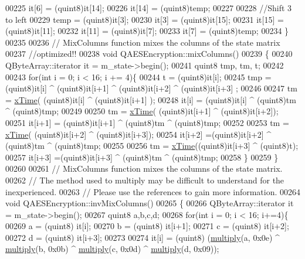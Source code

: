 \begin{DoxyCode}
00225     it[6]  = (quint8)it[14];
00226     it[14] = (quint8)temp;
00227 
00228     \textcolor{comment}{//Shift 3 to left}
00229     temp   = (quint8)it[3];
00230     it[3]  = (quint8)it[15];
00231     it[15] = (quint8)it[11];
00232     it[11] = (quint8)it[7];
00233     it[7]  = (quint8)temp;
00234 \}
00235 
00236 \textcolor{comment}{// MixColumns function mixes the columns of the state matrix}
00237 \textcolor{comment}{//optimized!!}
00238 \textcolor{keywordtype}{void} QAESEncryption::mixColumns()
00239 \{
00240   QByteArray::iterator it = m\_state->begin();
00241   quint8 tmp, tm, t;
00242 
00243   \textcolor{keywordflow}{for}(\textcolor{keywordtype}{int} i = 0; i < 16; i += 4)\{
00244     t       = (quint8)it[i];
00245     tmp     =  (quint8)it[i] ^ (quint8)it[i+1] ^ (quint8)it[i+2] ^ (quint8)it[i+3] ;
00246 
00247     tm      = \mbox{\hyperlink{qaesencryption_8cpp_a94a5c6f286db021d028ddc6f91a65f72}{xTime}}( (quint8)it[i] ^ (quint8)it[i+1] );
00248     it[i]   = (quint8)it[i] ^ (quint8)tm ^ (quint8)tmp;
00249 
00250     tm      = \mbox{\hyperlink{qaesencryption_8cpp_a94a5c6f286db021d028ddc6f91a65f72}{xTime}}( (quint8)it[i+1] ^ (quint8)it[i+2]);
00251     it[i+1] = (quint8)it[i+1] ^ (quint8)tm ^ (quint8)tmp;
00252 
00253     tm      = \mbox{\hyperlink{qaesencryption_8cpp_a94a5c6f286db021d028ddc6f91a65f72}{xTime}}( (quint8)it[i+2] ^ (quint8)it[i+3]);
00254     it[i+2] =(quint8)it[i+2] ^ (quint8)tm ^ (quint8)tmp;
00255 
00256     tm      = \mbox{\hyperlink{qaesencryption_8cpp_a94a5c6f286db021d028ddc6f91a65f72}{xTime}}((quint8)it[i+3] ^ (quint8)t);
00257     it[i+3] =(quint8)it[i+3] ^ (quint8)tm ^ (quint8)tmp;
00258   \}
00259 \}
00260 
00261 \textcolor{comment}{// MixColumns function mixes the columns of the state matrix.}
00262 \textcolor{comment}{// The method used to multiply may be difficult to understand for the inexperienced.}
00263 \textcolor{comment}{// Please use the references to gain more information.}
00264 \textcolor{keywordtype}{void} QAESEncryption::invMixColumns()
00265 \{
00266   QByteArray::iterator it = m\_state->begin();
00267   quint8 a,b,c,d;
00268   \textcolor{keywordflow}{for}(\textcolor{keywordtype}{int} i = 0; i < 16; i+=4)\{
00269     a = (quint8) it[i];
00270     b = (quint8) it[i+1];
00271     c = (quint8) it[i+2];
00272     d = (quint8) it[i+3];
00273 
00274     it[i]   = (quint8) (\mbox{\hyperlink{qaesencryption_8cpp_adcc23c7a5520793f14710fff6ef23dfe}{multiply}}(a, 0x0e) ^ \mbox{\hyperlink{qaesencryption_8cpp_adcc23c7a5520793f14710fff6ef23dfe}{multiply}}(b, 0x0b) ^ 
      \mbox{\hyperlink{qaesencryption_8cpp_adcc23c7a5520793f14710fff6ef23dfe}{multiply}}(c, 0x0d) ^ \mbox{\hyperlink{qaesencryption_8cpp_adcc23c7a5520793f14710fff6ef23dfe}{multiply}}(d, 0x09));

\end{DoxyCode}
